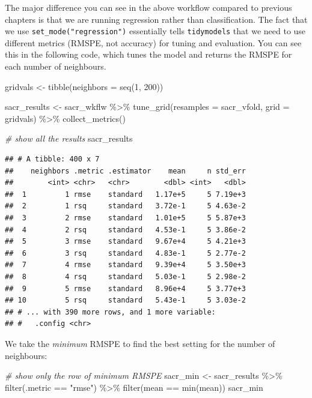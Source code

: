\documentclass[
]{krantz}
\makeatletter
\newenvironment{Shaded}{\begin{snugshade}}{\end{snugshade}}
\newcommand{\AttributeTok}[1]{\textcolor[rgb]{0.61,0.61,0.61}{#1}}
\newcommand{\CommentTok}[1]{\textcolor[rgb]{0.37,0.37,0.37}{\textit{#1}}}
\newcommand{\DecValTok}[1]{\textcolor[rgb]{0.06,0.06,0.06}{#1}}
\newcommand{\FunctionTok}[1]{\textcolor[rgb]{0,0,0}{#1}}
\newcommand{\NormalTok}[1]{#1}
\newcommand{\OtherTok}[1]{\textcolor[rgb]{0.37,0.37,0.37}{#1}}
\newcommand{\SpecialCharTok}[1]{\textcolor[rgb]{0,0,0}{#1}}
\newcommand{\StringTok}[1]{\textcolor[rgb]{0.5,0.5,0.5}{#1}}
\newenvironment{kframe}{%
\medskip{}
\setlength{\fboxsep}{.8em}
 \def\at@end@of@kframe{}%
 \ifinner\ifhmode%
  \def\at@end@of@kframe{\end{minipage}}%
  \begin{minipage}{\columnwidth}%
 \fi\fi%
 \def\FrameCommand##1{\hskip\@totalleftmargin \hskip-\fboxsep
 \colorbox{shadecolor}{##1}\hskip-\fboxsep
     \hskip-\linewidth \hskip-\@totalleftmargin \hskip\columnwidth}%
 \MakeFramed {\advance\hsize-\width
   \@totalleftmargin\z@ \linewidth\hsize
   \@setminipage}}%
 {\par\unskip\endMakeFramed%
 \at@end@of@kframe}
\renewenvironment{Shaded}{\begin{kframe}}{\end{kframe}}
\makeatother
\begin{document}
The major difference you can see in the above workflow compared to previous
chapters is that we are running regression rather than classification. The fact
that we use \texttt{set\_mode("regression")} essentially
tells \texttt{tidymodels} that we need to use different metrics (RMSPE, not accuracy)
for tuning and evaluation. You can see this in the following code, which tunes
the model and returns the RMSPE for each number of neighbours.

\begin{Shaded}
\begin{Highlighting}[]
\NormalTok{gridvals }\OtherTok{\textless{}{-}} \FunctionTok{tibble}\NormalTok{(}\AttributeTok{neighbors =} \FunctionTok{seq}\NormalTok{(}\DecValTok{1}\NormalTok{, }\DecValTok{200}\NormalTok{))}

\NormalTok{sacr\_results }\OtherTok{\textless{}{-}}\NormalTok{ sacr\_wkflw }\SpecialCharTok{\%\textgreater{}\%}
  \FunctionTok{tune\_grid}\NormalTok{(}\AttributeTok{resamples =}\NormalTok{ sacr\_vfold, }\AttributeTok{grid =}\NormalTok{ gridvals) }\SpecialCharTok{\%\textgreater{}\%}
  \FunctionTok{collect\_metrics}\NormalTok{()}

\CommentTok{\# show all the results}
\NormalTok{sacr\_results}
\end{Highlighting}
\end{Shaded}

\begin{verbatim}
## # A tibble: 400 x 7
##    neighbors .metric .estimator    mean     n std_err
##        <int> <chr>   <chr>        <dbl> <int>   <dbl>
##  1         1 rmse    standard   1.17e+5     5 7.19e+3
##  2         1 rsq     standard   3.72e-1     5 4.63e-2
##  3         2 rmse    standard   1.01e+5     5 5.87e+3
##  4         2 rsq     standard   4.53e-1     5 3.86e-2
##  5         3 rmse    standard   9.67e+4     5 4.21e+3
##  6         3 rsq     standard   4.83e-1     5 2.77e-2
##  7         4 rmse    standard   9.39e+4     5 3.50e+3
##  8         4 rsq     standard   5.03e-1     5 2.98e-2
##  9         5 rmse    standard   8.96e+4     5 3.77e+3
## 10         5 rsq     standard   5.43e-1     5 3.03e-2
## # ... with 390 more rows, and 1 more variable:
## #   .config <chr>
\end{verbatim}

We take the \emph{minimum} RMSPE to find the best setting for the number of neighbours:

\begin{Shaded}
\begin{Highlighting}[]
\CommentTok{\# show only the row of minimum RMSPE}
\NormalTok{sacr\_min }\OtherTok{\textless{}{-}}\NormalTok{ sacr\_results }\SpecialCharTok{\%\textgreater{}\%}
  \FunctionTok{filter}\NormalTok{(.metric }\SpecialCharTok{==} \StringTok{"rmse"}\NormalTok{) }\SpecialCharTok{\%\textgreater{}\%}
  \FunctionTok{filter}\NormalTok{(mean }\SpecialCharTok{==} \FunctionTok{min}\NormalTok{(mean))}
\NormalTok{sacr\_min}
\end{Highlighting}
\end{Shaded}
\end{document}
